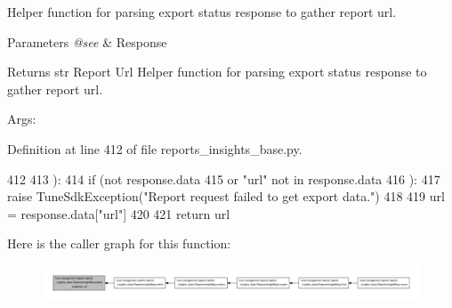 Helper function for parsing export status response to gather report url. 


\begin{DoxyParams}{Parameters}
{\em @see} & Response \\
\hline
\end{DoxyParams}
\begin{DoxyReturn}{Returns}
str Report Url Helper function for parsing export status response to gather report url. \begin{DoxyVerb}        Args:\end{DoxyVerb}
 
\end{DoxyReturn}


Definition at line 412 of file reports\-\_\-insights\-\_\-base.\-py.


\begin{DoxyCode}
412 
413     ):
414         \textcolor{keywordflow}{if} (\textcolor{keywordflow}{not} response.data
415             \textcolor{keywordflow}{or} \textcolor{stringliteral}{"url"} \textcolor{keywordflow}{not} \textcolor{keywordflow}{in} response.data
416         ):
417             \textcolor{keywordflow}{raise} TuneSdkException(\textcolor{stringliteral}{"Report request failed to get export data."})
418 
419         url = response.data[\textcolor{stringliteral}{"url"}]
420 
421         \textcolor{keywordflow}{return} url
\end{DoxyCode}


Here is the caller graph for this function\-:
\nopagebreak
\begin{figure}[H]
\begin{center}
\leavevmode
\includegraphics[width=350pt]{classtune_1_1management_1_1reports_1_1reports__insights__base_1_1ReportsInsightBase_ac71e815c7e9b4f3183b81d221589cbfb_icgraph}
\end{center}
\end{figure}


